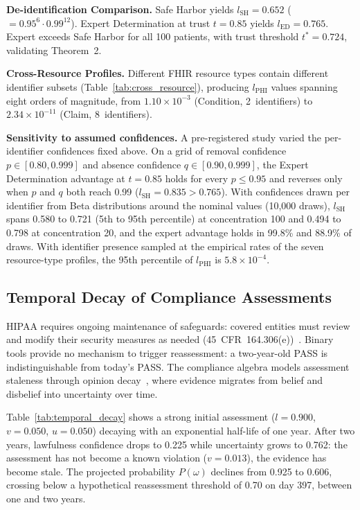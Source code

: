 \documentclass[conference]{IEEEtran}
\begin{document}


\textbf{De-identification Comparison.} Safe Harbor yields $l_{\text{SH}} = 0.652$ ($= 0.95^6 \cdot 0.99^{12}$). Expert Determination at trust $t = 0.85$ yields $l_{\text{ED}} = 0.765$. Expert exceeds Safe Harbor for all 100 patients, with trust threshold $t^* = 0.724$, validating Theorem~2.

\textbf{Cross-Resource Profiles.} Different FHIR resource types contain different identifier subsets (Table~\ref{tab:cross_resource}), producing $l_{\text{PHI}}$ values spanning eight orders of magnitude, from $1.10 \times 10^{-3}$ (Condition, 2~identifiers) to $2.34 \times 10^{-11}$ (Claim, 8~identifiers).

\textbf{Sensitivity to assumed confidences.} A pre-registered study varied the per-identifier confidences fixed above. On a grid of removal confidence $p \in [0.80, 0.999]$ and absence confidence $q \in [0.90, 0.999]$, the Expert Determination advantage at $t = 0.85$ holds for every $p \leq 0.95$ and reverses only when $p$ and $q$ both reach 0.99 ($l_{\text{SH}} = 0.835 > 0.765$). With confidences drawn per identifier from Beta distributions around the nominal values (10,000 draws), $l_{\text{SH}}$ spans 0.580 to 0.721 (5th to 95th percentile) at concentration 100 and 0.494 to 0.798 at concentration 20, and the expert advantage holds in 99.8\% and 88.9\% of draws. With identifier presence sampled at the empirical rates of the seven resource-type profiles, the 95th percentile of $l_{\text{PHI}}$ is $5.8 \times 10^{-4}$.



\subsection{Temporal Decay of Compliance Assessments}

HIPAA requires ongoing maintenance of safeguards: covered entities must
review and modify their security measures as needed
(45~CFR~164.306(e))~\cite{hipaa_security}. Binary tools provide no mechanism
to trigger reassessment: a two-year-old PASS is indistinguishable from
today's PASS. The compliance algebra models assessment staleness through
opinion decay~\cite{josang2016subjective}, where evidence migrates from
belief and disbelief into uncertainty over time.

Table~\ref{tab:temporal_decay} shows a strong initial assessment
($l = 0.900$, $v = 0.050$, $u = 0.050$) decaying with an exponential half-life
of one year. After two years, lawfulness confidence drops to 0.225 while
uncertainty grows to 0.762: the assessment has not become a known
violation ($v = 0.013$), the evidence has become stale. The projected
probability $P(\omega)$ declines from 0.925 to 0.606, crossing below a
hypothetical reassessment threshold of 0.70 on day 397, between one and two years.
\end{document}
